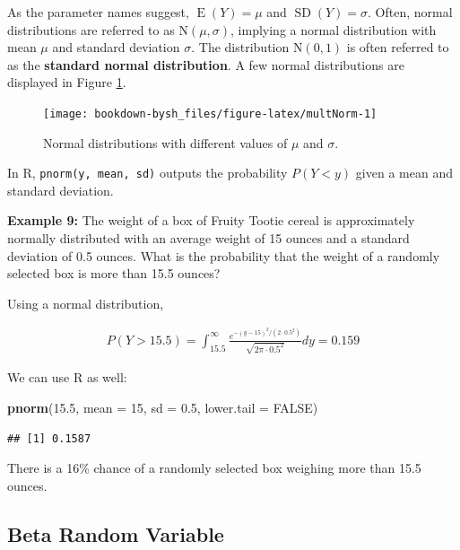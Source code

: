 \documentclass[
]{krantz}
\newenvironment{Shaded}{\begin{snugshade}}{\end{snugshade}}
\newcommand{\DataTypeTok}[1]{\textcolor[rgb]{0.27,0.27,0.27}{#1}}
\newcommand{\DecValTok}[1]{\textcolor[rgb]{0.06,0.06,0.06}{#1}}
\newcommand{\FloatTok}[1]{\textcolor[rgb]{0.06,0.06,0.06}{#1}}
\newcommand{\KeywordTok}[1]{\textcolor[rgb]{0.27,0.27,0.27}{\textbf{#1}}}
\newcommand{\NormalTok}[1]{#1}
\newcommand{\OtherTok}[1]{\textcolor[rgb]{0.37,0.37,0.37}{#1}}
\newcommand{\E}{\operatorname{E}}
\newcommand{\SD}{\operatorname{SD}}
\begin{document}
As the parameter names suggest, \(\E(Y) = \mu\) and \(\SD(Y) = \sigma\). Often, normal distributions are referred to as \(\textrm{N}(\mu, \sigma)\), implying a normal distribution  with mean \(\mu\) and standard deviation \(\sigma\). The distribution \(\textrm{N}(0,1)\) is often referred to as the \textbf{standard normal distribution}. A few normal distributions are displayed in Figure \ref{fig:multNorm}.



\begin{figure}

{\centering \texttt{[image: bookdown-bysh\_files/figure-latex/multNorm-1]} 

}

\caption{Normal distributions with different values of \(\mu\) and \(\sigma\).}\label{fig:multNorm}
\end{figure}

In R, \texttt{pnorm(y,\ mean,\ sd)} outputs the probability \(P(Y < y)\) given a mean and standard deviation.

\textbf{Example 9:} The weight of a box of Fruity Tootie cereal is approximately normally distributed with an average weight of 15 ounces and a standard deviation of 0.5 ounces. What is the probability that the weight of a randomly selected box is more than 15.5 ounces?

Using a normal distribution,

\begin{align*} 
P(Y > 15.5) = \int_{15.5}^{\infty} \frac{e^{-(y-15)^2/ (2\cdot 0.5^2)}}{\sqrt{2\pi\cdot 0.5^2}}dy = 0.159
\end{align*}

We can use R as well:

\begin{Shaded}
\begin{Highlighting}[]
\KeywordTok{pnorm}\NormalTok{(}\FloatTok{15.5}\NormalTok{, }\DataTypeTok{mean =} \DecValTok{15}\NormalTok{, }\DataTypeTok{sd =} \FloatTok{0.5}\NormalTok{, }\DataTypeTok{lower.tail =} \OtherTok{FALSE}\NormalTok{)}
\end{Highlighting}
\end{Shaded}

\begin{verbatim}
## [1] 0.1587
\end{verbatim}

There is a 16\% chance of a randomly selected box weighing more than 15.5 ounces.

\hypertarget{beta-random-variable}{%
\subsection{Beta Random Variable}\label{beta-random-variable}}
\end{document}
